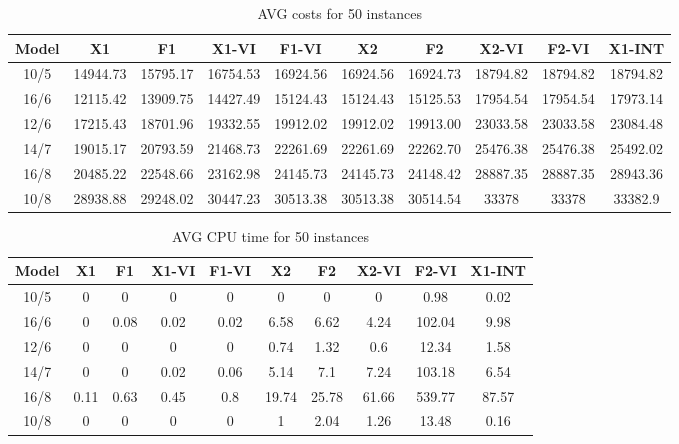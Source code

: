 \begin{landscape}
\begin{table}
\centering
  \caption{AVG costs for 50 instances}
  \renewcommand{\arraystretch}{1.3}
\begin{tabular}{|c|ccccccccc|}
\hline 
Model & X1 & F1 & X1-VI & F1-VI & X2 & F2 & X2-VI & F2-VI & X1-INT \\ 
\hline 
10/5 & 14944.73 & 15795.17	& 16754.53	& 16924.56	& 16924.56	& 16924.73	& 18794.82 &	18794.82 &	18794.82 \\ 
16/6 & 12115.42 &	13909.75 &	14427.49 &	15124.43 &	15124.43 &	15125.53 &	17954.54 &	17954.54 &	17973.14 \\ 
12/6 & 17215.43	& 18701.96 & 	19332.55 &	19912.02 &	19912.02 &	19913.00 &	23033.58 &	23033.58 &	23084.48 \\ 
14/7 &	19015.17 &	20793.59	 & 21468.73	& 22261.69	& 22261.69	& 22262.70 &	25476.38 &	25476.38 &	25492.02 \\
16/8 &	20485.22	 & 22548.66 &	23162.98 &	24145.73 &	24145.73	 & 24148.42 &	28887.35	 & 28887.35	& 28943.36 \\
10/8	 & 28938.88 &	29248.02 &	30447.23	 & 30513.38 & 	30513.38	 & 30514.54	& 33378	& 	33378	&	33382.9 \\
\hline 
\end{tabular} 

  \label{tab:avgcost}
\end{table}

\begin{table}
\centering
  \caption{AVG CPU time for 50 instances}
  \renewcommand{\arraystretch}{1.3}
\begin{tabular}{|c|ccccccccc|}
\hline 
Model & X1 & F1 & X1-VI & F1-VI & X2 & F2 & X2-VI & F2-VI & X1-INT \\ 
\hline 
10/5 &	0 &	0	& 0	& 0 & 	0 &	0	 & 0& 	0.98 &	0.02\\ 
16/6	 &0 &	0.08 &	0.02 &	0.02 &	6.58 &	6.62 &	4.24 &	102.04 &	9.98 \\ 
12/6 &  	 0 & 	0 &	0 &	0 &	0.74 &	1.32 &	0.6 &	12.34 &	1.58 \\ 
14/7	 & 0 &	0	& 0.02 &	0.06 &	5.14 &	7.1 &	7.24 &	103.18 & 	6.54\\
16/8	 & 0.11 &	0.63 &	0.45 &	0.8 &	19.74 &	25.78 &	61.66 &	539.77 & 	87.57 \\
10/8 &  	0 &	0	& 0 & 	0	& 1	& 2.04	& 1.26	& 13.48	& 0.16 \\
\hline 
\end{tabular} 

  \label{tab:avgcost}
\end{table}
\end{landscape}


